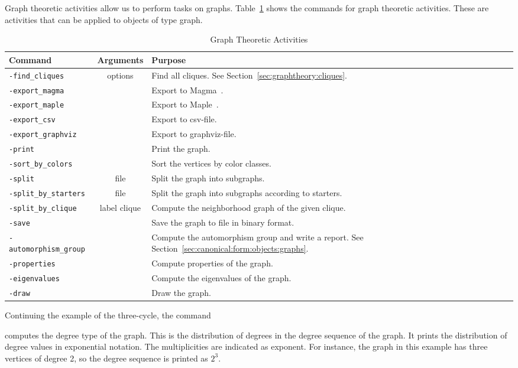 Graph theoretic activities allow us to perform tasks on graphs.
Table~\ref{tab:graphactivities} shows the commands for graph theoretic activities.
These are activities that can be applied to objects of type graph. 
\begin{table}
\begin{center}
\begin{tabular}{|p{4cm}|c|p{7cm}|}
\hline
Command & Arguments & Purpose \\
\hline
\hline
\verb'-find_cliques' & options  & Find all cliques. See Section~\ref{sec:graphtheory:cliques}. \\
\hline
\verb'-export_magma' &   & Export to Magma~\cite{Magma}. \\
\hline
\verb'-export_maple' &   & Export to Maple~\cite{Maple}. \\
\hline
\verb'-export_csv' &   & Export to csv-file. \\
\hline
\verb'-export_graphviz' &   & Export to graphviz-file. \\
\hline
\verb'-print' &   & Print the graph. \\
\hline
\verb'-sort_by_colors' &   & Sort the vertices by color classes. \\
\hline
\verb'-split' & file  & Split the graph into subgraphs. \\
\hline
\verb'-split_by_starters' & file  & Split the graph into subgraphs according to starters. \\
\hline
\verb'-split_by_clique' & label clique  & Compute the neighborhood graph of the given clique. \\
\hline
\verb'-save' &   & Save the graph to file in binary format. \\
\hline
\verb'-automorphism_group' &   & Compute the automorphism group and write a report. See Section~\ref{sec:canonical:form:objects:graphs}. \\
\hline
\verb'-properties' &   & Compute properties of the graph. \\
\hline
\verb'-eigenvalues' &   & Compute the eigenvalues of the graph. \\
\hline
\verb'-draw' &   & Draw the graph. \\
\hline
\end{tabular}
\end{center}
\caption{\label{tab:graphactivities}Graph Theoretic Activities}
\end{table}


\bigskip

Continuing the example of the three-cycle, the command 
{\tt

}
computes the degree type of the graph. 
This is the distribution of degrees in the degree sequence of the graph.
It prints the distribution of degree values in exponential notation. 
The multiplicities are indicated as exponent. 
For instance, the graph in this example has three vertices of degree 2, 
so the degree sequence is printed as $2^3.$

